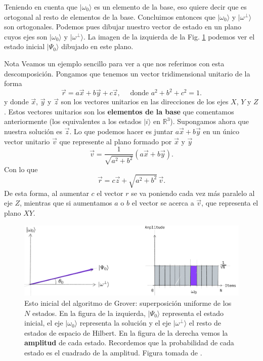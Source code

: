 \documentclass[a4paper,11pt]{book} %
\numberwithin{equation}{chapter}
\def\lp{\left(}
\def\rp{\right)}
\begin{document}
Teniendo en cuenta que $|\omega_0 \rangle$ es un elemento de la base, eso quiere decir que es ortogonal al resto de elementos de la base. Concluimos entonces que $|\omega_0 \rangle$ y $| \omega^{\perp} \rangle$ son ortogonales. Podemos pues dibujar nuestro vector de estado en un plano cuyos ejes son $|\omega_0 \rangle$ y $|\omega^{\perp} \rangle$. La imagen de la izquierda de la Fig. \ref{Fig_geo_1} podemos ver el estado inicial $| \Psi_0 \rangle$ dibujado en este plano. 

	\begin{mybox_blue}{Nota}
	Veamos un ejemplo sencillo para ver a que nos referimos con esta descomposición. Pongamos que 
	tenemos un vector tridimensional unitario de la forma
	$$ \vec{r} = a \vec{x} + b \vec{y} + c \vec{z}, \quad \text{ donde } a^2+b^2+c^2 = 1 .$$
	y donde $\vec{x}$, $\vec{y}$ y $\vec{z}$ son los vectores unitarios en las direcciones de los ejes
	$X$, $Y$ y $Z$. Estos vectores unitarios son los \textbf{elementos de la base} que comentamos 
	anteriormente (los equivalentes a los estados $|i\rangle$ en $\mathbb{R}^3$). Supongamos ahora que
	nuestra solución es $\vec{z}$. Lo que podemos hacer es juntar $a \vec{x} + b \vec{y}$ en un único
	vector unitario $\vec{v}$ que represente al plano formado por $\vec{x}$ y $\vec{y}$
	$$ \vec{v} = \frac{1}{\sqrt{a^2+b^2}} \lp a \vec{x} + b \vec{y} \rp. $$
	Con lo que
	$$ \vec{r} = c \vec{z} + \sqrt{a^2+b^2} \, \vec{v}. $$
	De esta forma, al aumentar $c$ el vector $r$ se va poniendo cada vez más paralelo
	al eje $Z$, mientras que si aumentamos $a$ o $b$ el vector se acerca a $\vec{v}$, que representa el 
	plano $XY$.
	
	\end{mybox_blue}


	\begin{figure}[t]
	\centering 
	\includegraphics[width=0.85\linewidth]{Figuras/Fig_geo_1.png}
	\caption{Esto inicial del algoritmo de Grover: superposición uniforme de los $N$ estados. 	En la figura de la izquierda, $| \Psi_0 \rangle$ representa el estado inicial, 	el eje $|\omega_0 \rangle $ representa la solución y el eje $| \omega^{\perp} \rangle$ el resto de estados de espacio de Hilbert. En la figura de la derecha vemos la \textbf{amplitud} de cada estado. Recordemos que la probabilidad de cada estado es el cuadrado de la amplitud. Figura tomada de \cite{bib_Qiskit-Grover}.}
	\label{Fig_geo_1}
	\end{figure}
\end{document}
